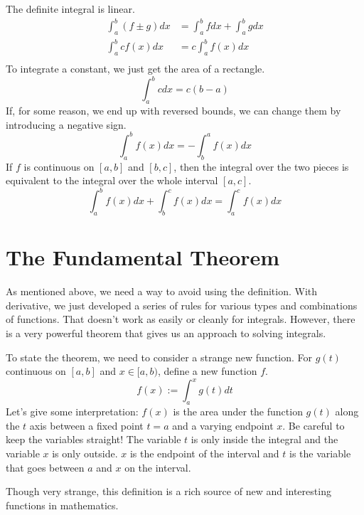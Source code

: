 \documentclass[fleqn]{report}
\begin{document}
The definite integral is linear.
\begin{align*} 
\int_a^b (f \pm g) dx & = \int_a^b f dx + \int_a^b g dx \\
\int_a^b c f(x) dx & = c \int_a^b f(x) dx \\
\end{align*}
To integrate a constant, we just get the area of a rectangle.
\begin{equation*}
\int_a^b c dx = c(b-a)
\end{equation*}
If, for some reason, we end up with reversed bounds, we can
change them by introducing a negative sign.
\begin{equation*}
\int_a^b f(x) dx = - \int_b^a f(x) dx 
\end{equation*}
If $f$ is continuous on $[a,b]$ and $[b,c]$, then the integral
over the two pieces is equivalent to the integral over the
whole interval $[a,c]$.
\begin{equation*} 
\int_a^bf(x) dx + \int_b^c f(x) dx = \int_a^c f(x) dx 
\end{equation*}

\section{The Fundamental Theorem} 
\label{fundamental-theorem}

As mentioned above, we need a way to avoid using the
definition. With derivative, we just developed a series of
rules for various types and combinations of functions. That
doesn't work as easily or cleanly for integrals. However,
there is a very powerful theorem that gives us an approach to
solving integrals.

To state the theorem, we need to consider a strange new
function. For $g(t)$ continuous on $[a,b]$ and $x \in [a,b)$,
define a new function $f$.
\begin{equation*}
f(x) := \int_a^x g(t) dt 
\end{equation*}
Let's give some interpretation: $f(x)$ is the area under the
function $g(t)$ along the $t$ axis between a fixed point
$t=a$ and a varying endpoint $x$. Be careful to keep the
variables straight! The variable $t$ is only inside the
integral and the variable $x$ is only outside. $x$ is the
endpoint of the interval and $t$ is the variable that goes
between $a$ and $x$ on the interval.

Though very strange, this definition is a rich source of new and
interesting functions in mathematics. 
\end{document}

